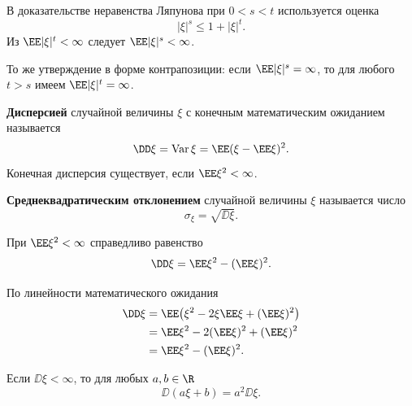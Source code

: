 \begin{Proof}
    В доказательстве неравенства Ляпунова при $0<s<t$ используется оценка
    \[
        |\xi|^s\leq 1+|\xi|^t.
    \]
    Из $\EE|\xi|^t<\infty$ следует $\EE|\xi|^s<\infty$.

    \smallskip
    То же утверждение в форме контрапозиции: если $\EE|\xi|^s=\infty$,
    то для любого $t>s$ имеем $\EE|\xi|^t=\infty$.
\end{Proof}


\begin{definition}
    \textbf{Дисперсией} случайной величины $\xi$ с конечным математическим
    ожиданием называется
    \[
        \DD\xi=\operatorname{Var}\xi
        =\EE(\xi-\EE\xi)^2.
    \]
    Конечная дисперсия существует, если $\EE\xi^2<\infty$.
\end{definition}

\begin{definition}
    \textbf{Среднеквадратическим отклонением} случайной величины $\xi$
    называется число
    \[
        \sigma_\xi=\sqrt{\DD\xi}.
    \]
\end{definition}

\begin{theorem}
    При $\EE\xi^2<\infty$ справедливо равенство
    \[
        \DD\xi=\EE\xi^2-(\EE\xi)^2.
    \]
\end{theorem}

\begin{Proof}
    По линейности математического ожидания
    \[
        \begin{aligned}
            \DD\xi
            &=\EE\bigl(\xi^2-2\xi\EE\xi+(\EE\xi)^2\bigr)\\
            &=\EE\xi^2-2(\EE\xi)^2+(\EE\xi)^2\\
            &=\EE\xi^2-(\EE\xi)^2.
        \end{aligned}
    \]
\end{Proof}
\begin{theorem}
    Если $\DD\xi<\infty$, то для любых $a,b\in\R$
    \[
        \DD(a\xi+b)=a^2\DD\xi.
    \]
\end{theorem}


